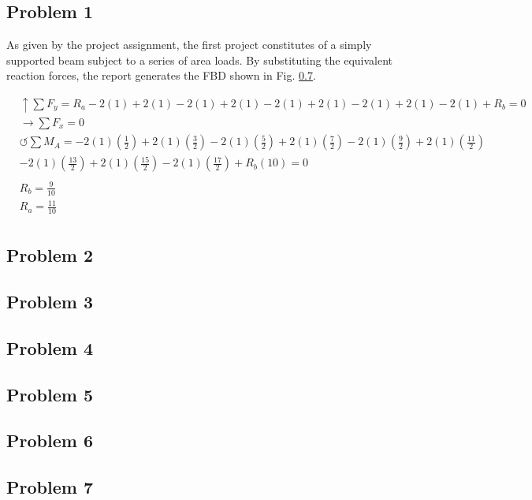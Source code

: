 \documentclass[a4paper]{article}
\begin{document}
\subsection{Problem 1}

As given by the project assignment, the first project constitutes of a simply supported beam subject to a series of area loads. By substituting the equivalent reaction forces, the report generates the FBD shown in Fig. \ref{}.

\begin{equation}
\begin{split}
	&\uparrow \sum F_y = R_a - 2(1) + 2(1) - 2(1) + 2(1) - 2(1) + 2(1) - 2(1) + 2(1) - 2(1) + R_b = 0 \\
 	&\rightarrow \sum F_x = 0 \\
 	&\circlearrowleft \sum M_A = -2(1)\left(\frac{1}{2}\right) + 2(1)\left(\frac{3}{2}\right) - 2(1)\left(\frac{5}{2}\right) + 2(1)\left(\frac{7}{2}\right) - 2(1)\left(\frac{9}{2}\right) + 2(1)\left(\frac{11}{2}\right) \\ 
	& - 2(1)\left(\frac{13}{2}\right) + 2(1)\left(\frac{15}{2}\right) - 2(1)\left(\frac{17}{2}\right) + R_b(10) = 0 \\
	& \\
	& R_b = \frac{9}{10} \\
	& R_a = \frac{11}{10} \\
\end{split}
\label{problem1_reactions}
\end{equation}

\subsection{Problem 2}
\lipsum[1]
\subsection{Problem 3}
\lipsum[1]
\subsection{Problem 4}
\lipsum[1]
\subsection{Problem 5}
\lipsum[1]
\subsection{Problem 6}
\lipsum[1]
\subsection{Problem 7}
\lipsum[1]
\end{document}
